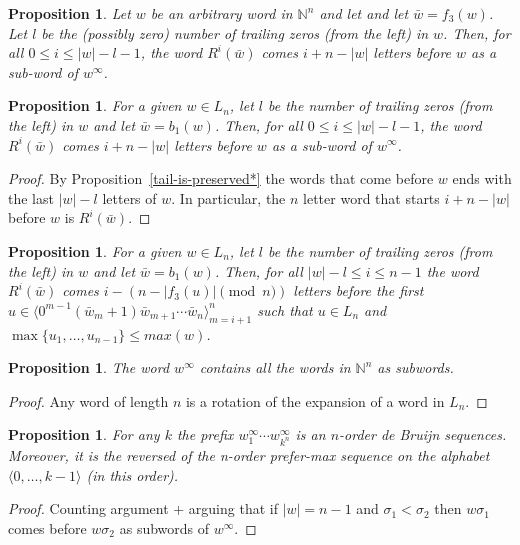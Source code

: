 \documentclass{article}
\newtheorem{proposition}[theorem]{Proposition}
\theoremstyle{definition}
\newcommand{\N}{{\mathbb{N}}}
\newcommand{\T}[1]{\langle{#1}\rangle}
\newcommand{\rr}[2]{R^{#2}({#1})}
\begin{document}
\begin{proposition}\label{simple-pos}
	Let $w$ be an arbitrary word in $\N^n$ and let and let $\bar{w}=f_3(w)$. Let $l$ be the (possibly zero) number of trailing zeros (from the left) in $w$.  Then, for all $0 \leq i \leq |w|-l-1$, the word $\rr{\bar{w}}{i}$ comes $i+n-|w|$ letters before $w$ as a sub-word of $w^\infty$.
\end{proposition}



\begin{proposition}\label{simple-pos}
	For a given $w \in L_n$, let $l$ be the number of trailing zeros (from the left) in $w$ and let $\bar{w}=b_1(w)$. Then, for all $0 \leq i \leq |w|-l-1$, the word $\rr{\bar{w}}{i}$ comes $i+n-|w|$ letters before $w$ as a sub-word of $w^\infty$.
\end{proposition}
\begin{proof}
	By Proposition~\ref{tail-is-preserved*} the words that come before $w$ ends with the last $|w|-l$ letters of $w$. In particular, the $n$ letter word that starts $i+n-|w|$ before $w$ is $\rr{\bar{w}}{i}$.
\end{proof}

\begin{proposition}\label{advanced-pos}
	For a given $w \in L_n$, let $l$ be the number of trailing zeros (from the left) in $w$ and let $\bar{w}=b_1(w)$. Then, for all $|w|-l \leq i \leq n-1$ the word $\rr{\bar{w}}{i}$ comes $i-(n-|f_3(u)| \pmod n)$ letters before the first $u \in \T{0^{m-1} (\bar{w}_{m} + 1) \bar{w}_{m+1}\cdots \bar{w}_n}_{m=i+1}^{n}$ such that $u \in L_n$ and  $\max\{u_1,\dots,u_{n-1}\} \leq max(w)$.
\end{proposition}


\begin{proposition}
	The word $w^\infty$ contains all the words in $\N^n$ as subwords.
\end{proposition}
\begin{proof}
	Any word of length $n$ is a rotation of the expansion of a word in $L_n$.
\end{proof}


\begin{proposition}
	For any $k$ the prefix $w^\infty_1 \cdots w^\infty_{k^n}$ is an $n$-order de Bruijn sequences. Moreover, it is the reversed of the n-order prefer-max sequence on the alphabet $\T{0,\dots,k-1}$ (in this order). 
\end{proposition}
\begin{proof}
	Counting argument + arguing that if $|w| =n-1$ and $\sigma_1 < \sigma_2$ then $w\sigma_1$ comes before $w\sigma_2$ as subwords of $w^\infty$.
\end{proof}
\end{document}
